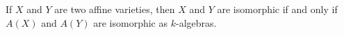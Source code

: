 If $X$ and $Y$ are two affine varieties, then $X$ and $Y$ are isomorphic if and only if $A(X)$ and $A(Y)$ are isomorphic as $k$-algebras.
